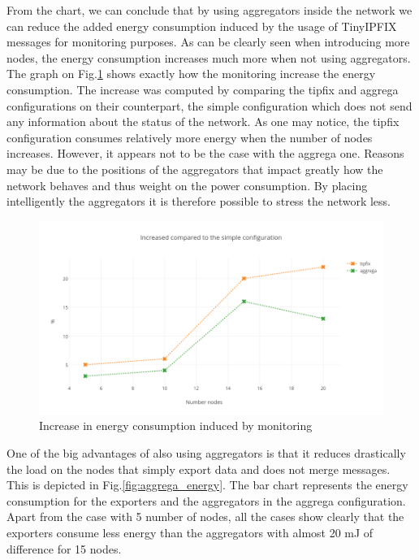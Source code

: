 From the chart, we can conclude that by using aggregators inside the network we can reduce the added energy consumption induced by the usage of TinyIPFIX messages for monitoring purposes. As can be clearly seen when introducing more nodes, the energy consumption increases much more when not using aggregators. The graph on Fig.\ref{fig:increase_energy} shows exactly how the monitoring increase the energy consumption. The increase was computed by comparing the tipfix and aggrega configurations on their counterpart, the simple configuration which does not send any information about the status of the network. As one may notice, the tipfix configuration consumes relatively more energy when the number of nodes increases. However, it appears not to be the case with the aggrega one. Reasons may be due to the positions of the aggregators that impact greatly how the network behaves and thus weight on the power consumption. By placing intelligently the aggregators it is therefore possible to stress the network less.\\

\begin{figure}[h]
  \includegraphics[width=\textwidth]{res/increase_energy.png}
  \caption{Increase in energy consumption induced by monitoring}
  \label{fig:increase_energy}
\end{figure}

One of the big advantages of also using aggregators is that it reduces drastically the load on the nodes that simply export data and does not merge messages. This is depicted in Fig.\ref{fig:aggrega_energy}. The bar chart represents the energy consumption for the exporters and the aggregators in the aggrega configuration. Apart from the case with 5 number of nodes, all the cases show clearly that the exporters consume less energy than the aggregators with almost 20 mJ of difference for 15 nodes.\\

